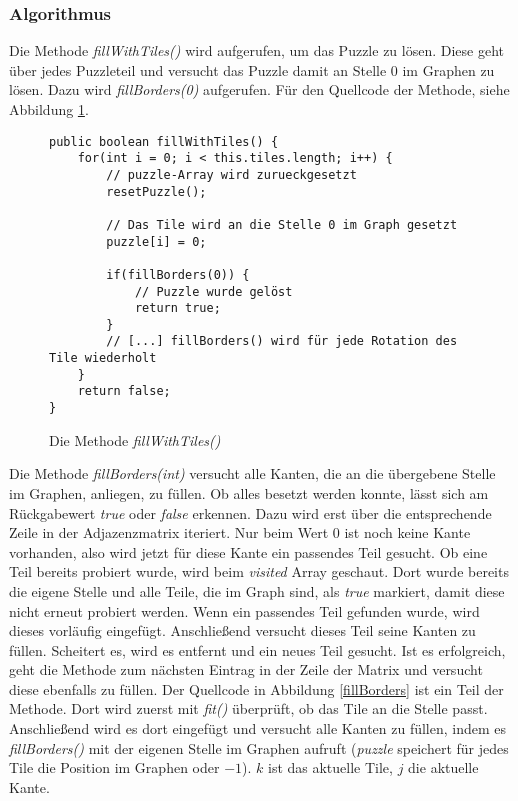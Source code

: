 \documentclass[a4paper, 12pt]{scrartcl}
\begin{document}
\subsubsection{Algorithmus}

Die Methode \emph{fillWithTiles()} wird aufgerufen, um das Puzzle zu lösen. Diese geht über jedes Puzzleteil und versucht das Puzzle damit an Stelle $0$ im Graphen zu lösen. Dazu wird \emph{fillBorders(0)} aufgerufen. Für den Quellcode der Methode, siehe Abbildung \ref{fillWithTiles}.

\begin{figure}[h]
    \centering

\begin{lstlisting}
public boolean fillWithTiles() {
	for(int i = 0; i < this.tiles.length; i++) {
		// puzzle-Array wird zurueckgesetzt
		resetPuzzle();

        // Das Tile wird an die Stelle 0 im Graph gesetzt
        puzzle[i] = 0;
		
        if(fillBorders(0)) {
            // Puzzle wurde gelöst
            return true;
        }
        // [...] fillBorders() wird für jede Rotation des Tile wiederholt
    }
	return false;
}
\end{lstlisting}

    \caption{Die Methode \emph{fillWithTiles()}}
    \label{fillWithTiles}
\end{figure}

Die Methode \emph{fillBorders(int)} versucht alle Kanten, die an die übergebene Stelle im Graphen, anliegen, zu füllen. Ob alles besetzt werden konnte, lässt sich am Rückgabewert \emph{true} oder \emph{false} erkennen. Dazu wird erst über die entsprechende Zeile in der Adjazenzmatrix iteriert. Nur beim Wert $0$ ist noch keine Kante vorhanden, also wird jetzt für diese Kante ein passendes Teil gesucht. Ob eine Teil bereits probiert wurde, wird beim \emph{visited} Array geschaut. Dort wurde bereits die eigene Stelle und alle Teile, die im Graph sind, als \emph{true} markiert, damit diese nicht erneut probiert werden. Wenn ein passendes Teil gefunden wurde, wird dieses vorläufig eingefügt. Anschließend versucht dieses Teil seine Kanten zu füllen. Scheitert es, wird es entfernt und ein neues Teil gesucht. Ist es erfolgreich, geht die Methode zum nächsten Eintrag in der Zeile der Matrix und versucht diese ebenfalls zu füllen. Der Quellcode in Abbildung \ref{fillBorders} ist ein Teil der Methode. Dort wird zuerst mit \emph{fit()} überprüft, ob das Tile an die Stelle passt. Anschließend wird es dort eingefügt und versucht alle Kanten zu füllen, indem es \emph{fillBorders()} mit der eigenen Stelle im Graphen aufruft (\emph{puzzle} speichert für jedes Tile die Position im Graphen oder $-1$). $k$ ist das aktuelle Tile, $j$ die aktuelle Kante.
\end{document}
